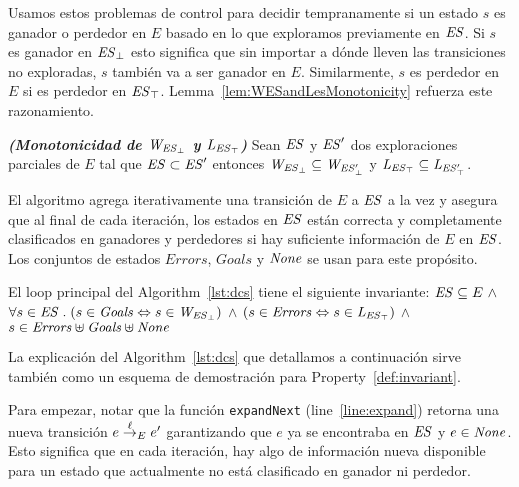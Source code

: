 Usamos estos problemas de control para decidir tempranamente si un estado $s$ es ganador o perdedor en $E$ basado en lo que exploramos previamente en $\mathit{ES}$. Si $s$ es ganador en $\mathit{\mathit{ES}_{\bot}}$ esto significa que sin importar a dónde lleven las transiciones no exploradas, $s$ también va a ser ganador en $E$. Similarmente, $s$ es perdedor en $E$ si es perdedor en $\mathit{\mathit{ES}_{\top}}$.
Lemma~\ref{lem:WESandLesMonotonicity} refuerza este razonamiento.


\begin{lemma}\textbf{\emph{(Monotonicidad de $\mathit{W_{\mathit{\mathit{ES}_{\bot}}}}$ y $\mathit{L_{\mathit{\mathit{ES}_{\top}}}}$)}}
\label{lem:WESandLesMonotonicity}
Sean $\mathit{ES}$ y $\mathit{ES}'$ dos exploraciones parciales de $E$ tal que $\mathit{ES} 
\subset \mathit{ES}'$ entonces $\mathit{W_{\mathit{\mathit{ES}_{\bot}}}} \subseteq \mathit{W_{\mathit{\mathit{ES}'_{\bot}}}}$ y $\mathit{L_{\mathit{\mathit{ES}_{\top}}}} \subseteq 
\mathit{L_{\mathit{\mathit{ES}'_{\top}}}}$.
\end{lemma}

El algoritmo agrega iterativamente una transición de $E$ a $\mathit{ES}$ a la vez y asegura que al final de cada iteración, los estados en $\mathit{ES}$ están correcta y completamente clasificados en ganadores y perdedores si hay suficiente información de $E$ en $\mathit{ES}$. Los conjuntos de estados $Errors$, 
$Goals$ y $\mathit{None}$ se usan para este propósito.

\begin{property}[Invariante]
\label{def:invariant}
El loop principal del Algorithm~\ref{lst:dcs} tiene el siguiente invariante: 
$\mathit{ES} \subseteq E \ \wedge $ $\forall s \in \mathit{ES} \;.\; (s\in\mathit{Goals} 
\Leftrightarrow 
s \in 
\mathit{W_{\mathit{\mathit{ES}_{\bot}}}})$ $\wedge$  $(s\in\mathit{Errors} 
\Leftrightarrow s \in \mathit{L_{\mathit{\mathit{ES}_{\top}}}})$ $\wedge$  
$s\in\mathit{Errors}\uplus\mathit{Goals}\uplus\mathit{None}$

\end{property}

La explicación del Algorithm~\ref{lst:dcs} que detallamos a continuación sirve también como un esquema de demostración para Property~\ref{def:invariant}.   

Para empezar, notar que la función \texttt{expandNext} 
(line~\ref{line:expand}) retorna una nueva transición $e \overset{\ell}{\rightarrow}_{E} e'$ 
garantizando que $e$ ya se encontraba en $\mathit{ES}$ y $e \in \mathit{None}$. 
Esto significa que en cada iteración, hay algo de información nueva disponible para un estado que actualmente no está clasificado en ganador ni perdedor.


